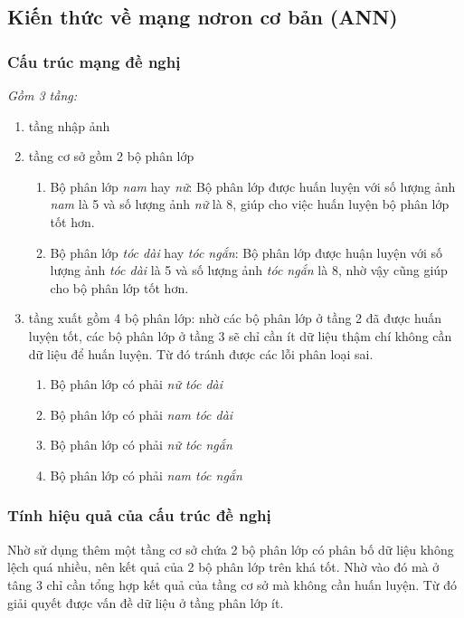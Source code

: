 \subsection{Kiến thức về mạng nơron cơ bản (ANN)}
\subsubsection{Cấu trúc mạng đề nghị}
\textit{Gồm 3 tầng:}
\begin{enumerate}
	\item tầng nhập ảnh
	\item tầng cơ sở gồm 2 bộ phân lớp
	\begin{enumerate}
		\item Bộ phân lớp \textit{nam} hay \textit{nữ}: Bộ phân lớp được huấn luyện với số lượng ảnh \textit{nam} là 5 và số lượng ảnh \textit{nữ} là 8, giúp cho việc huấn luyện bộ phân lớp tốt hơn.
		\item Bộ phân lớp \textit{tóc dài} hay \textit{tóc ngắn}: Bộ phân lớp được huận luyện với số lượng ảnh \textit{tóc dài} là 5 và số lượng ảnh \textit{tóc ngắn} là 8, nhờ vậy cũng giúp cho bộ phân lớp tốt hơn.
	\end{enumerate}
	\item tầng xuất gồm 4 bộ phân lớp: nhờ các bộ phân lớp ở tầng 2 đã được huấn luyện tốt, các bộ phân lớp ở tầng 3 sẽ chỉ cần ít dữ liệu thậm chí không cần dữ liệu để huấn luyện. Từ đó tránh được các lỗi phân loại sai.
	\begin{enumerate}
		\item Bộ phân lớp có phải \textit{nữ tóc dài}
		\item Bộ phân lớp có phải \textit{nam tóc dài}
		\item Bộ phân lớp có phải \textit{nữ tóc ngắn}
		\item Bộ phân lớp có phải \textit{nam tóc ngắn}
	\end{enumerate}
\end{enumerate}

\subsubsection{Tính hiệu quả của cấu trúc đề nghị}
Nhờ sử dụng thêm một tầng cơ sở chứa 2 bộ phân lớp có phân bố dữ liệu không lệch quá nhiều, nên kết quả của 2 bộ phân lớp trên khá tốt. Nhờ vào đó mà ở tâng 3 chỉ cần tổng hợp kết quả của tầng cơ sở mà không cần huấn luyện. Từ đó giải quyết được vấn đề dữ liệu ở tầng phân lớp ít.
\pagebreak
